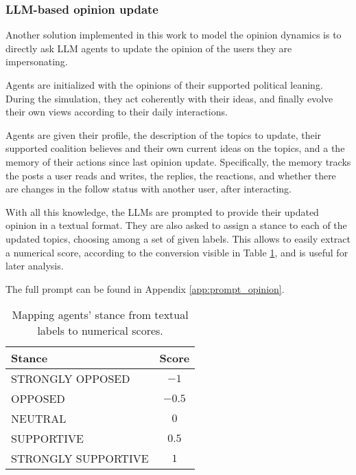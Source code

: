 \subsubsection{LLM-based opinion update}
Another solution implemented in this work to model the opinion dynamics is to directly ask LLM agents to update the opinion of the users they are impersonating.

Agents are initialized with the opinions of their supported political leaning. During the simulation, they act coherently with their ideas, and finally evolve their own views according to their daily interactions.

Agents are given their profile, the description of the topics to update, their supported coalition believes and their own current ideas on the topics, and a the memory of their actions since last opinion update.
Specifically, the memory tracks the posts a user reads and writes, the replies, the reactions, and whether there are changes in the follow status with another user, after interacting. 

With all this knowledge, the LLMs are prompted to provide their updated opinion in a textual format.
They are also asked to assign a stance to each of the updated topics, choosing among a set of given labels. This allows to easily extract a numerical score, according to the conversion visible in Table \ref{tab:stance}, and is useful for later analysis.

The full prompt can be found in Appendix \ref{app:prompt_opinion}.

\begin{table}[h]
\centering
\begin{tabular}{|l|c|}
\hline
\textbf{Stance} & \textbf{Score} \\
\hline
STRONGLY OPPOSED   & $-1$ \\
OPPOSED            & $-0.5$ \\
NEUTRAL            & $0$ \\
SUPPORTIVE         & $0.5$ \\
STRONGLY SUPPORTIVE & $1$ \\
\hline
\end{tabular}
\caption{Mapping agents' stance from textual labels to numerical scores.}
\label{tab:stance}
\end{table}
